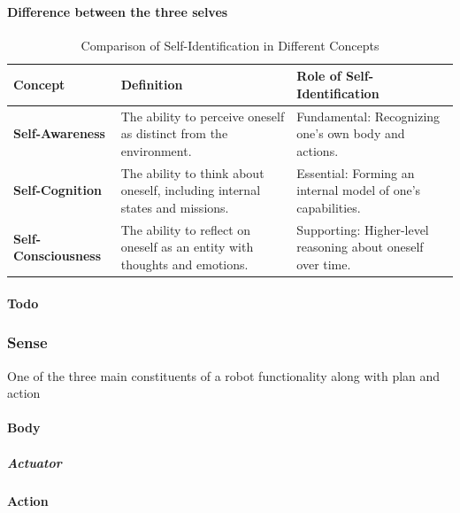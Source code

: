 \documentclass{book}
\providecommand{\ProjectDeepHeading}[2]{%
    \par\medskip\noindent\textbf{#2}\par\smallskip
}
\begin{document}
\paragraph{Difference between the three selves}
\begin{table}[h!]
    \centering
    \begin{tabular}{|l|l|l|}
        \hline
        \textbf{Concept}
        & \textbf{Definition}
        & \textbf{Role of Self-Identification} \\ \hline
        \textbf{Self-Awareness}
        & The ability to perceive oneself as distinct from the environment.
        & Fundamental: Recognizing one’s own body and actions. \\ \hline
        \textbf{Self-Cognition}
        & The ability to think about oneself, including internal states and missions.
        & Essential: Forming an internal model of one’s capabilities. \\ \hline
        \textbf{Self-Consciousness}
        & The ability to reflect on oneself as an entity with thoughts and emotions.
        & Supporting: Higher-level reasoning about oneself over time. \\ \hline
    \end{tabular}
    \caption{Comparison of Self-Identification in Different Concepts}
\end{table}


\paragraph{Todo}


\subsubsection{Sense}
One of the three main constituents of a robot functionality along with plan and action

\paragraph{Body}

\subparagraph{Actuator}


\ProjectDeepHeading{2}{Action}
\end{document}
